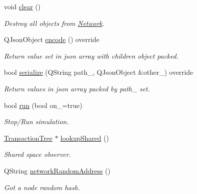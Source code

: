 \begin{DoxyCompactItemize}
\mbox{\label{classeven_1_1_network_ac318ee133974ab6e7d3fd47682b80cad}} 
void \mbox{\hyperlink{classeven_1_1_network_ac318ee133974ab6e7d3fd47682b80cad}{clear}} ()
\begin{DoxyCompactList}\small\item\em Destroy all objects from \mbox{\hyperlink{classeven_1_1_network}{Network}}. \end{DoxyCompactList}\item 
\mbox{\label{classeven_1_1_network_aff6a5743393c562f471e55f7de51adcc}} 
Q\+Json\+Object \mbox{\hyperlink{classeven_1_1_network_aff6a5743393c562f471e55f7de51adcc}{encode}} () override
\begin{DoxyCompactList}\small\item\em Return value set in json array with children object packed. \end{DoxyCompactList}\item 
\mbox{\label{classeven_1_1_network_ad9d1416d650c2f4d82046a4e34cce3c2}} 
bool \mbox{\hyperlink{classeven_1_1_network_ad9d1416d650c2f4d82046a4e34cce3c2}{serialize}} (Q\+String path\+\_\+, Q\+Json\+Object \&other\+\_\+) override
\begin{DoxyCompactList}\small\item\em Return values in json array packed by path\+\_\+ set. \end{DoxyCompactList}\item 
\mbox{\label{classeven_1_1_network_a25621b6b9d80ae1157f1e835d4246ca8}} 
bool \mbox{\hyperlink{classeven_1_1_network_a25621b6b9d80ae1157f1e835d4246ca8}{run}} (bool on\+\_\+=true)
\begin{DoxyCompactList}\small\item\em Stop/\+Run simulation. \end{DoxyCompactList}\item 
\mbox{\label{classeven_1_1_network_a759f66298d49cac154571b18f08e3cec}} 
\mbox{\hyperlink{classeven_1_1_transaction_tree}{Transaction\+Tree}} $\ast$ \mbox{\hyperlink{classeven_1_1_network_a759f66298d49cac154571b18f08e3cec}{lookup\+Shared}} ()
\begin{DoxyCompactList}\small\item\em Shared space observer. \end{DoxyCompactList}\item 
\mbox{\label{classeven_1_1_network_ad5432e76c4061ceea93de5322aa987c1}} 
Q\+String \mbox{\hyperlink{classeven_1_1_network_ad5432e76c4061ceea93de5322aa987c1}{network\+Random\+Address}} ()
\begin{DoxyCompactList}\small\item\em Got a node random hash. \end{DoxyCompactList}\end{DoxyCompactItemize}
